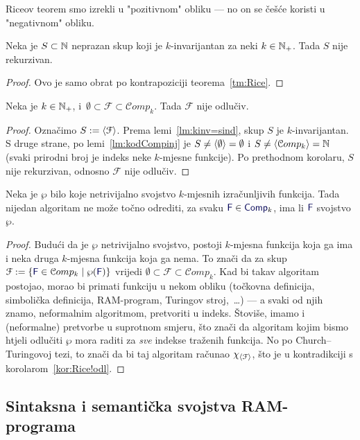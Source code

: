 Riceov teorem smo izrekli u "pozitivnom" obliku --- no on se češće koristi u "negativnom" obliku.

\begin{korolar}
Neka je $S\subset{\mathbb N}$ neprazan skup koji je $k$-invarijantan za neki $k\in{\mathbb N}_+$. Tada $S$ nije rekurzivan.
\end{korolar}
\begin{proof}
Ovo je samo obrat po kontrapoziciji teorema~\ref{tm:Rice}.
\end{proof}

\begin{korolar}\label{kor:Rice!odl}
Neka je $k\in{\mathbb N}_+$, i \,$\emptyset\subset\mathcal F\subset\mathcal Comp_k$. Tada $\mathcal F$ nije odlučiv.
\end{korolar}
\begin{proof}
Označimo $S:=\langle\mathcal F\rangle$. Prema lemi~\ref{lm:kinv=sind}, skup $S$ je $k$-invarijantan. S druge strane, po lemi~\ref{lm:kodCompinj} je $S\not=\langle\emptyset\rangle=\emptyset$ i $S\not=\langle\mathcal Comp_k\rangle={\mathbb N}$ (svaki prirodni broj je indeks neke $k$-mjesne funkcije). Po prethodnom korolaru, $S$ nije rekurzivan, odnosno $\mathcal F$ nije odlučiv.
\end{proof}

\begin{korolar}
Neka je $\wp$ bilo koje netrivijalno svojstvo $k$-mjesnih izračunljivih funkcija. Tada nijedan algoritam ne može točno odrediti, za svaku $\f F\in\f{Comp}_k$, ima li $\f F$ svojstvo $\wp$.
\end{korolar}
\begin{proof}
Budući da je $\wp$ netrivijalno svojstvo, postoji $k$-mjesna funkcija koja ga ima i neka druga $k$-mjesna funkcija koja ga nema. To znači da za skup $\mathcal F:=\{\f F\in\mathcal Comp_k\mid\wp(\f F)\}$ vrijedi $\emptyset\subset\mathcal F\subset\mathcal Comp_k$. Kad bi takav algoritam postojao, morao bi primati funkciju u nekom obliku (točkovna definicija, simbolička definicija, RAM-program, Turingov stroj,~\ldots) --- a svaki od njih znamo, neformalnim algoritmom, pretvoriti u indeks. Štoviše, imamo i (neformalne) pretvorbe u suprotnom smjeru, što znači da algoritam kojim bismo htjeli odlučiti $\wp$ mora raditi za \emph{sve} indekse traženih funkcija.
No po Church--\!Turingovoj tezi, to znači da bi taj algoritam računao $\chi_{\langle\mathcal F\rangle}$, što je u kontradikciji s korolarom~\ref{kor:Rice!odl}.
\end{proof}

\subsection{Sintaksna i semantička svojstva RAM-programa}

